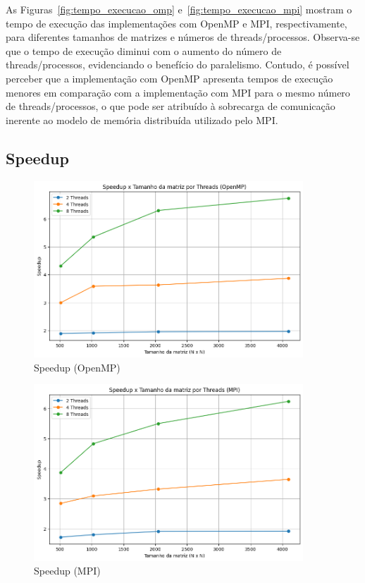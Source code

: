 \documentclass[12pt, a4paper]{article}
\begin{document}
    As Figuras~\ref{fig:tempo_execucao_omp} e~\ref{fig:tempo_execucao_mpi} mostram o tempo de execução das implementações com OpenMP e MPI, respectivamente, para diferentes tamanhos de matrizes e números de threads/processos. Observa-se que o tempo de execução diminui com o aumento do número de threads/processos, evidenciando o benefício do paralelismo. Contudo, é possível perceber que a implementação com OpenMP apresenta tempos de execução menores em comparação com a implementação com MPI para o mesmo número de threads/processos, o que pode ser atribuído à sobrecarga de comunicação inerente ao modelo de memória distribuída utilizado pelo MPI.\@

    \subsection{Speedup}

    \begin{figure}[H]
        \centering
        \includegraphics[width=0.9\textwidth]{img/speedup-openmp.png}
        \caption{Speedup (OpenMP)}\label{fig:speedup_omp}
    \end{figure}

    \begin{figure}[H]
        \centering
        \includegraphics[width=0.9\textwidth]{img/speedup-mpi.png}
        \caption{Speedup (MPI)}\label{fig:speedup_mpi}
    \end{figure}
\end{document}
